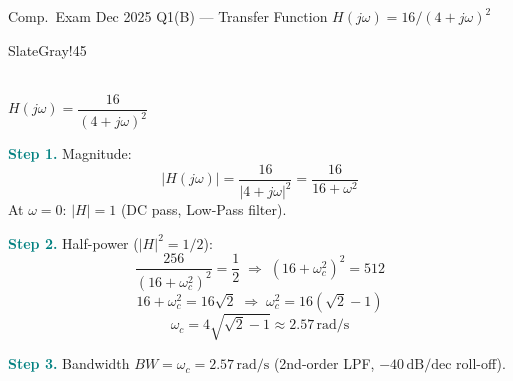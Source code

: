 \documentclass[a4paper, 11pt]{article}
\newcommand{\ans}[1]{\boxed{#1}}
\newcommand{\step}[1]{\par\smallskip\textcolor{Teal}{\textbf{Step #1.}}\enspace}
\begin{document}
\begin{solvedbox}{Comp.\ Exam Dec 2025 Q1(B) --- Transfer Function $H(j\omega)=16/(4+j\omega)^2$}
\noindent\begin{minipage}[t]{0.40\linewidth}
\vspace{0pt}
\begin{circbox}[LightBG]{SlateGray!45}
\centering
{}\\[3pt]
{\footnotesize $H(j\omega)=\dfrac{16}{(4+j\omega)^2}$}
\end{circbox}
\end{minipage}%
\hfill%
\begin{minipage}[t]{0.56\linewidth}
\vspace{0pt}
\step{1} Magnitude:
\[|H(j\omega)|=\frac{16}{|4+j\omega|^2}=\frac{16}{16+\omega^2}\]
At $\omega=0$: $|H|=\ans{1}$ (DC pass, Low-Pass filter).

\step{2} Half-power ($|H|^2=1/2$):
\[\frac{256}{(16+\omega_c^2)^2}=\frac{1}{2}\;\Rightarrow\;(16+\omega_c^2)^2=512\]
\[16+\omega_c^2=16\sqrt{2}\;\Rightarrow\;\omega_c^2=16(\sqrt{2}-1)\]
\[\ans{\omega_c=4\sqrt{\sqrt{2}-1}\approx2.57\,\mathrm{rad/s}}\]
\step{3} Bandwidth $BW=\omega_c=\ans{2.57\,\mathrm{rad/s}}$ (2nd-order LPF, $-40\,\mathrm{dB/dec}$ roll-off).
\end{minipage}
\end{solvedbox}
\end{document}
